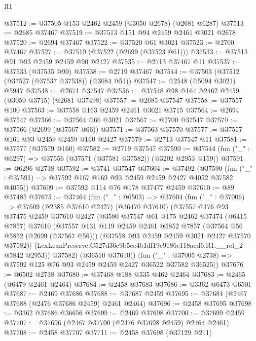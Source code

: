 \begin{lexlean}{R1}
\begin{coremodule}
@37512 := @37505 @153 @2462 @2459 (@3050 @2678) (@2681 @6287)
@37513 := @2685 @37467
@37519 := @37513 @151 @94 @2459 @2461 @3021 @2678
@37520 := @2694 @37467
@37522 := @37520 @61 @3021
@37523 := @2700 @37467
@37527 := @37519 (@37522 (@2699 (@37523 @61)))
@37533 := @37513 @91 @93 @2459 @2459 @90 @2427
@37535 := @2713 @37467 @11
@37537 := @37533 (@37535 @90)
@37538 := @2719 @37467
@37544 := @37503 (@37512 (@37527 (@37537 @37538)) (@3084 @51))
@37547 := @2548 (@5094 @3021) @5947
@37548 := @2671 @37547
@37556 := @37548 @98 @164 @2462 @2459 (@3050 @3715) (@2681 @37498)
@37557 := @2685 @37547
@37558 := @37557 @100
@37563 := @37558 @163 @2459 @2461 @3021 @3715
@37564 := @2694 @37547
@37566 := @37564 @66 @3021
@37567 := @2700 @37547
@37570 := @37566 (@2699 (@37567 @66))
@37571 := @37563 @37570
@37577 := @37557 @161 @93 @2459 @2459 @160 @2427
@37579 := @2713 @37547 @11
@37581 := @37577 (@37579 @160)
@37582 := @2719 @37547
@37590 := @37544 (fun ("_" : @6297) => @37556 (@37571 (@37581 @37582)) (@3202 @2953 @159))
@37591 := @6296 @2738
@37592 := @3741 @37547
@37604 := @37492
    (@37590 (fun ("_" : @37591) => @37592 @167 @169 @93 @2459 @2459 @2427 @4052 @37582 @4055))
@37609 := @37592 @114 @76 @178 @37477 @2459
@37610 := @89 @37485
@37675 := @37464
    (fun ("_" : @6503) =>
    @37604
      (fun ("_" : @37006) =>
      @37609
        (@2385 @37610 @2427)
        (@36470 @37610)
        (@37557
          @176
          @93
          @37475
          @2459
          @37610
          @2427
          (@3580
            @37547
            @61
            @175
            @2462
            @37474
            (@6415 @7857)
            @37610
            (@37557
              @131
              @119
              @2459
              @2461
              @5852
              @7857
              (@37564 @56 @5852 (@2699 (@37567 @56)))
              (@37558 @93 @2459 @2459 @3021 @2427 @37570 @37582))
            (LexLeanPreserve.C527d36e9b5ee4b1df19c9186e118acd6.R1.__rel_2 @5842 @2953))
          @37582)
        (@36510 @37610))
      (fun ("_" : @37005 @2738) => @37592 @125 @76 @93 @2459 @2459 @2427 @36522 @37582 @36525))
@37676 := @6502 @2738
@37680 := @37468 @188 @335 @462 @2464
@37683 := @2465 (@6479 @2461 @2464)
@37684 := @2458 @37683
@37686 := @3362 @6473 @6501
@37687 := @2469 @37686
@37688 := @37687 @2459
@37695 := @37684 (@2467 @37688 (@2476 @37686 @2459) @2461 @2464)
@37696 := @2458 @37695
@37698 := @3362 @37686 @36656
@37699 := @2469 @37698
@37700 := @37699 @2459
@37707 := @37696 (@2467 @37700 (@2476 @37698 @2459) @2464 @2461)
@37708 := @2458 @37707
@37711 := @2458 @37698 (@37129 @211)

\end{coremodule}
\end{lexlean}
